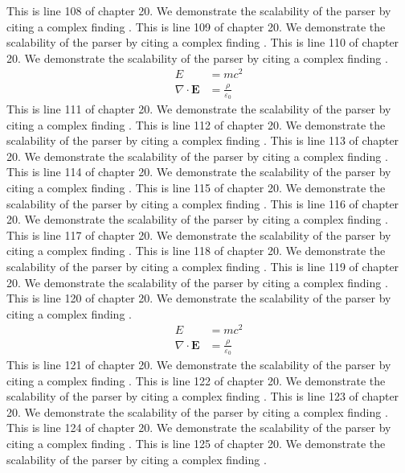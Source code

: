 This is line 108 of chapter 20. We demonstrate the scalability of the parser by citing a complex finding \cite{ref20_108}.
This is line 109 of chapter 20. We demonstrate the scalability of the parser by citing a complex finding \cite{ref20_109}.
This is line 110 of chapter 20. We demonstrate the scalability of the parser by citing a complex finding \cite{ref20_110}.
\begin{align*}
  E &= mc^2 \\
  \nabla \cdot \mathbf{E} &= \frac{\rho}{\varepsilon_0}
\end{align*}
This is line 111 of chapter 20. We demonstrate the scalability of the parser by citing a complex finding \cite{ref20_111}.
This is line 112 of chapter 20. We demonstrate the scalability of the parser by citing a complex finding \cite{ref20_112}.
This is line 113 of chapter 20. We demonstrate the scalability of the parser by citing a complex finding \cite{ref20_113}.
This is line 114 of chapter 20. We demonstrate the scalability of the parser by citing a complex finding \cite{ref20_114}.
This is line 115 of chapter 20. We demonstrate the scalability of the parser by citing a complex finding \cite{ref20_115}.
This is line 116 of chapter 20. We demonstrate the scalability of the parser by citing a complex finding \cite{ref20_116}.
This is line 117 of chapter 20. We demonstrate the scalability of the parser by citing a complex finding \cite{ref20_117}.
This is line 118 of chapter 20. We demonstrate the scalability of the parser by citing a complex finding \cite{ref20_118}.
This is line 119 of chapter 20. We demonstrate the scalability of the parser by citing a complex finding \cite{ref20_119}.
This is line 120 of chapter 20. We demonstrate the scalability of the parser by citing a complex finding \cite{ref20_120}.
\begin{align*}
  E &= mc^2 \\
  \nabla \cdot \mathbf{E} &= \frac{\rho}{\varepsilon_0}
\end{align*}
This is line 121 of chapter 20. We demonstrate the scalability of the parser by citing a complex finding \cite{ref20_121}.
This is line 122 of chapter 20. We demonstrate the scalability of the parser by citing a complex finding \cite{ref20_122}.
This is line 123 of chapter 20. We demonstrate the scalability of the parser by citing a complex finding \cite{ref20_123}.
This is line 124 of chapter 20. We demonstrate the scalability of the parser by citing a complex finding \cite{ref20_124}.
This is line 125 of chapter 20. We demonstrate the scalability of the parser by citing a complex finding \cite{ref20_125}.
